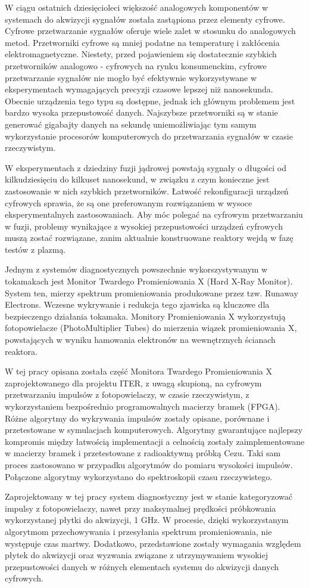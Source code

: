 W ciągu ostatnich dziesięcioleci większość analogowych komponentów
w systemach do akwizycji sygnałów została zastąpiona przez 
elementy cyfrowe. Cyfrowe przetwarzanie sygnałów oferuje
wiele zalet w stosunku do analogowych metod.
Przetworniki cyfrowe są mniej podatne na temperaturę i 
zakłócenia elektromagnetyczne.
Niestety, przed pojawieniem się dostatecznie szybkich przetworników analogowo - cyfrowych
na rynku konsumenckim, cyfrowe przetwarzanie sygnałów nie mogło być 
efektywnie wykorzystywane w eksperymentach wymagających precyzji czasowe
lepszej niż nanosekunda. 
Obecnie urządzenia tego typu są dostępne, jednak ich głównym problemem  
jest bardzo wysoka przepustowość danych. Najszybsze przetworniki
są w stanie generować gigabajty danych na sekundę uniemożliwiając
tym samym wykorzystanie procesorów komputerowych do przetwarzania sygnałów
w czasie rzeczywistym.


W eksperymentach z dziedziny fuzji jądrowej powstają sygnały
o długości od kilkudziesięciu do kilkuset nanosekund, w związku
z czym konieczne jest zastosowanie w nich szybkich przetworników.
Łatwość rekonfiguracji urządzeń cyfrowych sprawia,
że są one preferowanym rozwiązaniem w wysoce eksperymentalnych
zastosowaniach. Aby móc polegać na cyfrowym przetwarzaniu
w fuzji, problemy wynikające z wysokiej przepustowości 
urządzeń cyfrowych muszą zostać rozwiązane, zanim aktualnie konstruowane
reaktory wejdą w fazę testów z plazmą.


Jednym z systemów diagnostycznych powszechnie wykorszystywanym w 
tokamakach jest Monitor Twardego Promieniowania X (Hard X-Ray Monitor).
System ten, mierzy spektrum promieniowania produkowane przez tzw. Runaway
Electrons. Wczesne wykrywanie i redukcja tego zjawiska są kluczowe
dla bezpieczengo działania tokamaka.
Monitory Promieniowania X wykorzystują fotopowielacze (PhotoMultiplier Tubes)
do mierzenia wiązek promieniowania X, powstających w wyniku hamowania
elektronów na wewnętrznych ścianach reaktora.


W tej pracy opisana została część Monitora Twardego Promieniowania X 
zaprojektowanego dla projektu ITER, z uwagą skupioną, na cyfrowym przetwarzaniu
impulsów z fotopowielaczy, w czasie rzeczywistym, z wykorzystaniem bezpośrednio
programowalnych macierzy bramek (FPGA). Różne algorytmy do wykrywania 
impulsów zostały opisane, porównane i przetestowane w symulacjach komputerowych.
Algorytmy gwarantujące najlepszy kompromis między łatwością implementacji 
a celnością zostały zaimplementowane w macierzy bramek i przetestowane 
z radioaktywną próbką Cezu. Taki sam proces zastosowano w przypadku
algorytmów do pomiaru wysokości impulsów. Połączone algorytmy wykorzystano
do spektroskopii czasu rzeczywistego.


Zaprojektowany w tej pracy system diagnostyczny jest w stanie kategoryzować 
impulsy z fotopowielaczy, nawet przy maksymalnej prędkości próbkowania 
wykorzystanej płytki do akwizycji, 1 GHz. W procesie,
dzięki wykorzystanym algorytmom przechowywania i
przesyłania spektrum promieniowania, nie występuje czas martwy.
Dodatkowo, przedstawione zostały wymagania względem płytek do akwizycji oraz wyzwania
związane z utrzymywaniem wysokiej przepustowości danych w różnych elementach systemu
do akwizycji danych cyfrowych.

